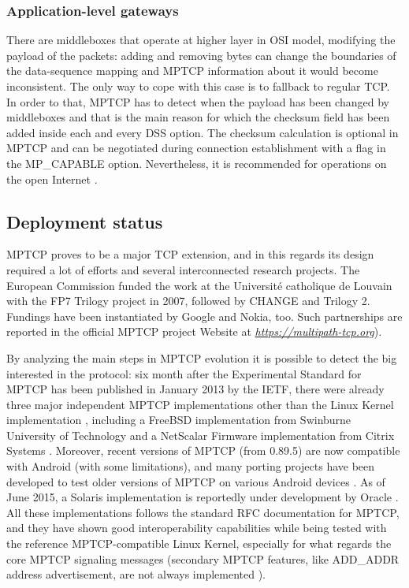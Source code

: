 \subsubsection{Application-level gateways}
There are middleboxes that operate at higher layer in OSI model, modifying the payload of the packets: adding and removing bytes can change the boundaries of the data-sequence mapping and MPTCP information about it would become inconsistent. The only way to cope with this case is to fallback to regular TCP. In order to that, MPTCP has to detect when the payload has been changed by middleboxes and that is the main reason for which the checksum field has been added inside each and every DSS option. The checksum calculation is optional in MPTCP and can be negotiated during connection establishment with a flag in the MP\_CAPABLE option. Nevertheless, it is recommended for operations on the open Internet \cite{HDPDB13}.

\subsection{Deployment status}
MPTCP proves to be a major TCP extension, and in this regards its design required a lot of efforts and several interconnected research projects. The European Commission funded the work at the Université catholique de Louvain with the FP7 Trilogy project in 2007, followed by CHANGE and Trilogy 2. Fundings have been instantiated by Google and Nokia, too. Such partnerships are reported in the official MPTCP project Website at \href{https://multipath-tcp.org}{\textit{https://multipath-tcp.org}}).

By analyzing the main steps in MPTCP evolution it is possible to detect the big interested in the protocol: six month after the Experimental Standard for MPTCP has been published in January 2013 by the IETF, there were already three major independent MPTCP implementations other than the Linux Kernel implementation \cite{eardley-mptcp-implementations-survey-02}, including a FreeBSD implementation from Swinburne University of Technology \cite{caia} and a NetScalar Firmware implementation from Citrix Systems \cite{netscalar}.
Moreover, recent versions of MPTCP (from 0.89.5) are now compatible with Android (with some limitations), and many porting projects have been developed to test older versions of MPTCP on various Android devices \cite{mptcpandroid}.
As of June 2015, a Solaris implementation is reportedly under development by Oracle \cite{mptcpsolaris}.
All these implementations follows the standard RFC documentation for MPTCP, and they have shown good interoperability capabilities while being tested with the reference MPTCP-compatible Linux Kernel, especially for what regards the core MPTCP signaling messages (secondary MPTCP features, like ADD\_ADDR address advertisement, are not always implemented \cite{eardley-mptcp-implementations-survey-02}).

